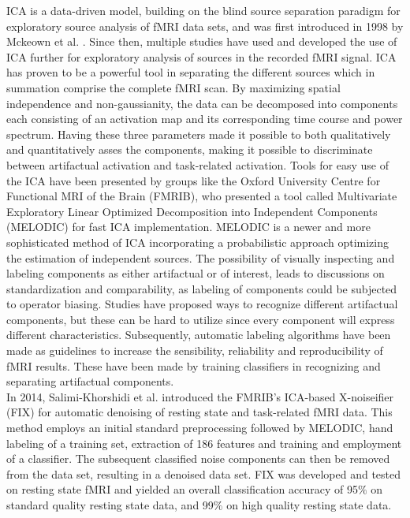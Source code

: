 ICA is a data-driven model, building on the blind source separation paradigm for exploratory source analysis of fMRI data sets, and was first introduced in 1998 by Mckeown et al. \cite{Mckeown1998}. Since then, multiple studies \cite{Calhoun2001a,Deslauriers2017,Parkes2018,Du2018,Tohka2008} have used and developed the use of ICA further for exploratory analysis of sources in the recorded fMRI signal. ICA has proven to be a powerful tool in separating the different sources which in summation comprise the complete fMRI scan. By maximizing spatial independence and non-gaussianity, the data can be decomposed into components each consisting of an activation map and its corresponding time course and power spectrum. \cite{Salimi-Khorshidi2014} Having these three parameters made it possible to both qualitatively and quantitatively asses the components, making it possible to discriminate between artifactual activation and task-related activation. Tools for easy use of the ICA have been presented by groups like the Oxford University Centre for Functional MRI of the Brain (FMRIB), who presented a tool called Multivariate Exploratory Linear Optimized Decomposition into Independent Components (MELODIC) for fast ICA implementation. MELODIC is a newer and more sophisticated method of ICA incorporating a probabilistic approach optimizing the estimation of independent sources. \cite{FMRIB2016} The possibility of visually inspecting and labeling components as either artifactual or of interest, leads to discussions on standardization and comparability, as labeling of components could be subjected to operator biasing. Studies \cite{Salimi-Khorshidi2014,Griffanti2017} have proposed ways to recognize different artifactual components, but these can be hard to utilize since every component will express different characteristics. Subsequently, automatic labeling algorithms have been made as guidelines to increase the sensibility, reliability and reproducibility of fMRI results. These have been made by training classifiers in recognizing and separating artifactual components. \cite{Tohka2008} \\
In 2014, Salimi-Khorshidi et al. \cite{Salimi-Khorshidi2014} introduced the FMRIB's ICA-based X-noiseifier (FIX) for automatic denoising of resting state and task-related fMRI data. This method employs an initial standard preprocessing followed by MELODIC, hand labeling of a training set, extraction of 186 features and training and employment of a classifier. The subsequent classified noise components can then be removed from the data set, resulting in a denoised data set. FIX was developed and tested on resting state fMRI and yielded an overall classification accuracy of 95$\percent$ on standard quality resting state data, and 99$\percent$ on high quality resting state data. \cite{Salimi-Khorshidi2014}   \\

